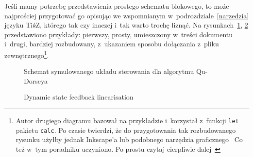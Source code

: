 {\red
Jeśli mamy potrzebę przedstawienia prostego schematu blokowego, to może najprościej przygotować go opisując we wspomnianym w~podrozdziale~\ref{narzedzia} języku Ti{\it k}Z, którego tak czy inaczej i~tak warto trochę liznąć. Na rysunkach~\ref{tikz_blok}, \ref{fig:dynamic_lin_diagram} przedstawiono przykłady: pierwszy, prosty, umieszczony w~treści dokumentu i~drugi, bardziej rozbudowany, z~ukazaniem sposobu dołączania z~pliku zewnętrznego\footnote{\red Autor drugiego diagramu bazował na przykładzie \cite{schem_blokowy} i~korzystał z~funkcji \texttt{let} pakietu \texttt{calc}. Po czasie twierdzi, że do przygotowania tak rozbudowanego rysunku użyłby jednak Inkscape'a lub podobnego narzędzia graficznego~\smiley{} Co też w~tym poradniku uczyniono. Po prostu czytaj cierpliwie dalej~\smiley}.}
\begin{figure}[tp]
  \centering
  \renewcommand{\figurename}{\red Rysunek}%
  \caption[Schemat symulowanego układu sterowania dla algorytmu Qu-Dorseya]{\red Schemat symulowanego układu sterowania dla algorytmu Qu-Dorseya}
  \label{tikz_blok}
\end{figure}
\begin{figure}[tp]
  \centering
  \renewcommand{\figurename}{\red Rysunek}%
  \caption[Dynamic state feedback linearisation \cite{jedrzej}]{\red Dynamic state feedback linearisation \cite{jedrzej}}
    \label{fig:dynamic_lin_diagram}
\end{figure}
